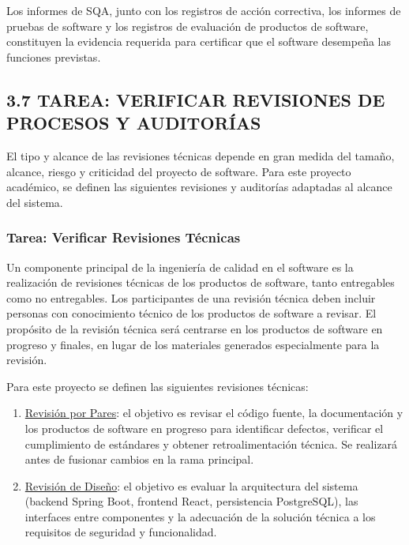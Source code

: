Los informes de SQA, junto con los registros de acción correctiva, los informes de pruebas de software y los registros de evaluación de productos de software, constituyen la evidencia requerida para certificar que el software desempeña las funciones previstas.

\subsection{3.7 TAREA: VERIFICAR REVISIONES DE PROCESOS Y AUDITORÍAS}
El tipo y alcance de las revisiones técnicas depende en gran medida del tamaño, alcance, riesgo y criticidad del proyecto de software. Para este proyecto académico, se definen las siguientes revisiones y auditorías adaptadas al alcance del sistema.

\subsubsection{ Tarea: Verificar Revisiones Técnicas}
Un componente principal de la ingeniería de calidad en el software es la realización de revisiones técnicas de los productos de software, tanto entregables como no entregables. Los participantes de una revisión técnica deben incluir personas con conocimiento técnico de los productos de software a revisar. El propósito de la revisión técnica será centrarse en los productos de software en progreso y finales, en lugar de los materiales generados especialmente para la revisión.

Para este proyecto se definen las siguientes revisiones técnicas:

\begin{enumerate}
    \item \underline{Revisión por Pares}: el objetivo es revisar el código fuente, la documentación y los productos de software en progreso para identificar defectos, verificar el cumplimiento de estándares y obtener retroalimentación técnica. Se realizará antes de fusionar cambios en la rama principal.
    \item \underline{Revisión de Diseño}: el objetivo es evaluar la arquitectura del sistema (backend Spring Boot, frontend React, persistencia PostgreSQL), las interfaces entre componentes y la adecuación de la solución técnica a los requisitos de seguridad y funcionalidad.
\end{enumerate}


